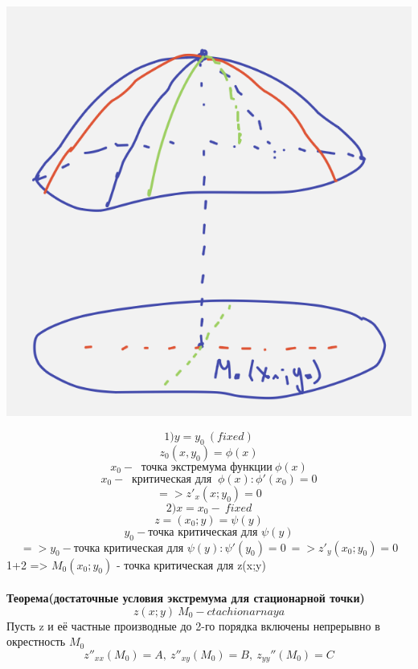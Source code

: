 \documentclass{article}
\begin{document}
\begin{center}
    \includegraphics[width=.3\textwidth]{feixed} 
\end{center}
\begin{equation*}
    1) y = y_0\ (fixed)
\end{equation*}
\begin{equation*}
    z_0(x, y_0) = \phi (x)
\end{equation*}
\begin{equation*}
    x_0 - \ \text{ точка экстремума функции}\ \phi (x)
\end{equation*}
\begin{equation*}
    x_0 - \ \text{ критическая для }\ \phi (x): \phi'(x_0) = 0
\end{equation*}
\begin{equation*}
=> z'_x(x; y_0) = 0
\end{equation*}
\begin{equation*}
    2) x = x_0 -\ fixed
\end{equation*}
\begin{equation*}
    z = (x_0; y) = \psi (y)
\end{equation*}
\begin{equation*}
    y_0 - \text{точка критическая для } \psi(y)
\end{equation*}
\begin{equation*}
    => y_0 - \text{точка критическая для } \psi(y) : \psi'(y_0)=0\ => z'_y(x_0;y_0)=0
\end{equation*}
1+2 => $M_0(x_0;y_0)$ - точка критическая для z(x;y)
\\ \\
\textbf{Теорема(достаточные условия экстремума для стационарной точки)}
\begin{equation*}
    z(x; y)\ M_0 - ctachionarnaya
\end{equation*}
Пусть z и её частные производные до 2-го порядка включены непрерывно в окрестность $M_0$
\begin{equation*}
    z''_{xx}(M_0) = A,\ z''_{xy}(M_0) = B,\ z_{yy}''(M_0)=C
\end{equation*}
\end{document}
